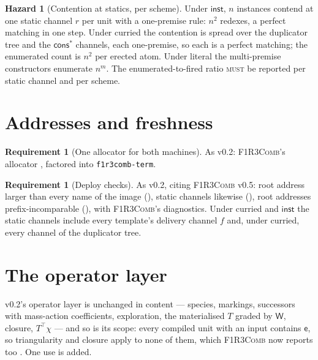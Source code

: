 \documentclass[11pt,a4paper]{article}
\newcommand{\code}[1]{\texttt{#1}}
\newcommand{\Comb}{\textsc{F1R3Comb}}
\newcommand{\MUST}{\textsc{must}}
\newcommand{\ev}{\mathsf{e}}
\newcommand{\Wt}{\mathsf{W}}
\theoremstyle{definition}
\newtheorem{requirement}[definition]{Requirement}
\newtheorem{hazard}[definition]{Hazard}
\theoremstyle{plain}
\newcommand{\inst}{\mathsf{inst}}
\newcommand{\cstar}{\mathsf{cons}^{*}}
\begin{document}
\begin{hazard}[Contention at statics, per scheme]\label{haz:statics}
Under $\inst$, $n$ instances contend at one static channel $r$ per unit with a
one-premise rule: $n^{2}$ redexes, a perfect matching in one step. Under
curried the contention is spread over the duplicator tree and the $\cstar$
channels, each one-premise, so each is a perfect matching; the enumerated
count is $n^{2}$ per erected atom. Under literal the multi-premise
constructors enumerate $n^{m}$. The enumerated-to-fired ratio \MUST{} be
reported per static channel and per scheme.
\end{hazard}

\section{Addresses and freshness}\label{sec:addr}

\begin{requirement}[One allocator for both machines]\label{req:oneallocator}
As v0.2: \Comb's allocator \cite[Req.~9.5]{combspec}, factored into
\code{f1r3comb-term}.
\end{requirement}

\begin{requirement}[Deploy checks]\label{req:deploychecks}
As v0.2, citing \Comb{} v0.5: root address larger than every name of the image
(\cite[Req.~5.24]{combspec}), static channels likewise
(\cite[Req.~5.27]{combspec}), root addresses prefix-incomparable
(\cite[Req.~5.28]{combspec}), with \Comb's diagnostics. Under curried and
$\inst$ the static channels include every template's delivery channel $f$
and, under curried, every channel of the duplicator tree.
\end{requirement}

\section{The operator layer}\label{sec:op}

v0.2's operator layer is unchanged in content --- species, markings,
successors with mass-action coefficients, exploration, the materialised
$T$ graded by $\Wt$, closure, $T^{\top}\chi$ --- and so is its scope: every
compiled unit with an input contains $\ev$, so triangularity and closure apply
to none of them, which \Comb{} now reports too \cite[Req.~10.2]{combspec}. One
use is added.
\end{document}

